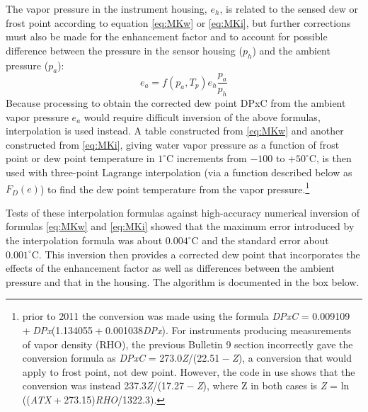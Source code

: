 \documentclass[
]{book}
\begin{document}
The vapor pressure in the instrument housing, \(e_h\), is related to the sensed dew or frost point according to equation \eqref{eq:MKw} or \eqref{eq:MKi}, but further corrections must also be made for the enhancement factor and to account for possible difference between the pressure in the sensor housing (\(p_h\)) and the ambient pressure (\(p_a\)):\\
\begin{equation}
e_{a}=f(p_{a},T_{p})e_{h}\frac{p_{a}}{p_{h}}
\label{eq:housingCorr}
\end{equation}
Because processing to obtain the corrected dew point DPxC from the ambient vapor pressure \(e_a\) would require difficult inversion of the above formulas, interpolation is used instead. A table constructed from \eqref{eq:MKw} and another constructed from \eqref{eq:MKi}, giving water vapor pressure as a function of frost point or dew point temperature in \(1^\circ\mathrm{C}\) increments from \(-100\) to \(+50^\circ\mathrm{C}\), is then used with three-point Lagrange interpolation (via a function described below as \(F_D(e)\)) to find the dew point temperature from the vapor pressure.\footnote{prior to 2011 the conversion was made using the formula {\emph{DPxC} = 0.009109 + \emph{DPx}(1.134055 + 0.001038\emph{DPx})}. For instruments producing measurements of vapor density (RHO), the previous Bulletin 9 section incorrectly gave the conversion formula as {\emph{DPxC} = 273.0\emph{Z}/(22.51 − \emph{Z})}, a conversion that would apply to frost point, not dew point. However, the code in use shows that the conversion was instead {237.3\emph{Z}/(17.27 − \emph{Z})}, where Z in both cases is {\emph{Z} = ln ((\emph{ATX} + 273.15)\emph{RHO}/1322.3)}.}

Tests of these interpolation formulas against high-accuracy numerical inversion of formulas \eqref{eq:MKw} and \eqref{eq:MKi} showed that the maximum error introduced by the interpolation formula was about \(0.004^\circ\mathrm{C}\) and the standard error about \(0.001^\circ\mathrm{C}\). This inversion then provides a corrected dew point that incorporates the effects of the enhancement factor as well as differences between the ambient pressure and that in the housing. The algorithm is documented in the box below.
\end{document}
